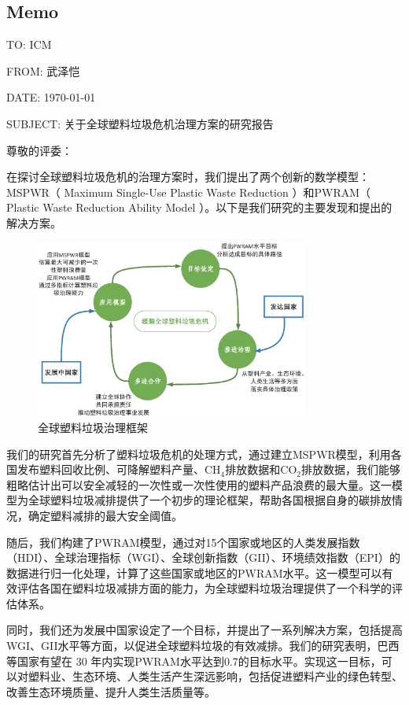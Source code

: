 \documentclass[UTF8, fontset=windows]{mcmthesis}
\begin{document}
\begin{appendices}

\section{Memo}

TO: ICM

FROM: 武泽恺

DATE: \today

SUBJECT: 关于全球塑料垃圾危机治理方案的研究报告

\begin{letter}{尊敬的评委：}

在探讨全球塑料垃圾危机的治理方案时，我们提出了两个创新的数学模型：MSPWR（ Maximum Single-Use Plastic Waste Reduction ）和PWRAM（ Plastic Waste Reduction Ability Model ）。以下是我们研究的主要发现和提出的解决方案。

\begin{figure}[h]
  \centering
  \includegraphics[width=0.8\textwidth]{figures/framework.eps}
  \caption{全球塑料垃圾治理框架}
  \label{fig:framework}
\end{figure}

我们的研究首先分析了塑料垃圾危机的处理方式，通过建立MSPWR模型，利用各国发布塑料回收比例、可降解塑料产量、$\text{CH}_4$排放数据和$\text{CO}_2$排放数据，我们能够粗略估计出可以安全减轻的一次性或一次性使用的塑料产品浪费的最大量。这一模型为全球塑料垃圾减排提供了一个初步的理论框架，帮助各国根据自身的碳排放情况，确定塑料减排的最大安全阈值。

随后，我们构建了PWRAM模型，通过对15个国家或地区的人类发展指数（HDI）、全球治理指标（WGI）、全球创新指数（GII）、环境绩效指数（EPI）的数据进行归一化处理，计算了这些国家或地区的PWRAM水平。这一模型可以有效评估各国在塑料垃圾减排方面的能力，为全球塑料垃圾治理提供了一个科学的评估体系。

同时，我们还为发展中国家设定了一个目标，并提出了一系列解决方案，包括提高WGI、GII水平等方面，以促进全球塑料垃圾的有效减排。我们的研究表明，巴西等国家有望在 30 年内实现PWRAM水平达到0.7的目标水平。实现这一目标，可以对塑料业、生态环境、人类生活产生深远影响，包括促进塑料产业的绿色转型、改善生态环境质量、提升人类生活质量等。


\end{letter}
\end{appendices}
\end{document}
